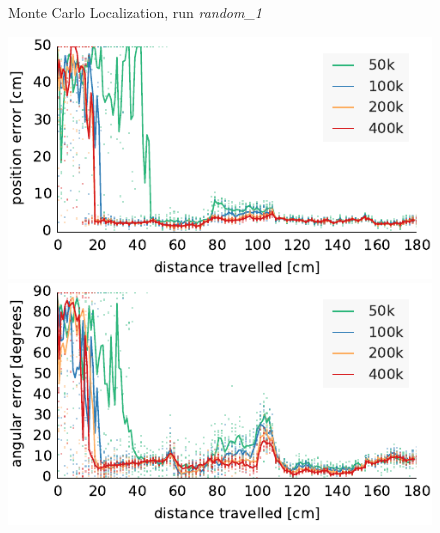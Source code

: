 \documentclass[letterpaper, 10pt, conference]{ieeeconf}
\begin{document}
\begin{figure}
\begin{center}
Monte Carlo Localization, run \emph{random\_1}
\end{center}
\includegraphics{mcl-whole_random_1-xy}\hfill
\includegraphics{mcl-whole_random_1-theta}

\vspace{.5em}


\end{figure}
\end{document}
